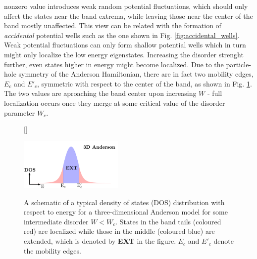 \documentclass[10pt,a4paper]{article}
\begin{document}
nonzero value introduces weak random potential fluctuations, which should only affect the states near the band extrema, while 
leaving those near the center of the band mostly unaffected. This view can be related with the formation of \emph{accidental} potential wells such as the one shown in Fig. \ref{fig:accidental_wells}. Weak potential fluctuations can only form shallow potential wells which in turn might only localize the low energy eigenstates. Increasing the disorder strenght further, even states higher in energy might become localized. Due to the particle-hole symmetry of the Anderson Hamiltonian, there are in fact two mobility edges, $E_c$ and $E'_c$, symmetric with respect to the center of the band, as shown in Fig. \ref{fig:DOS}. The two values are aproaching the band center upon increasing $W$ - full localization occurs once they merge at some critical value of the disorder parameter $W_c$.
\begin{figure}[H]
[\FBwidth]
{\caption{A schematic of a typical density of states (DOS) distribution with respect to energy for a three-dimensional Anderson model for some intermediate disorder $W<W_c$. States in the band tails (coloured red) are localized while those in the middle (coloured blue) are extended, which is denoted by \textbf{EXT} in the figure. $E_c$ and $E'_c$ denote the mobility edges.  }\label{fig:DOS}}
{\includegraphics[width=0.45\textwidth]{mobility_edge_DOS_modified.pdf}}
\end{figure} 
\end{document}
